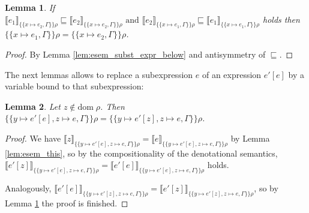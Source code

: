 \documentclass{jfp1}
\newtheorem{lemma}{Lemma}
\theoremstyle{nonumberbreak}
\newtheorem{proof}{Proof}
\newcommand{\dom}[1]{\text{dom}\;#1}
\newcommand{\dsem}[2]{\llbracket #1 \rrbracket_{#2}}
\newcommand{\esem}[1]{\{\!\!\!\{#1\}\!\!\!\}}
\begin{document}
\begin{lemma}
If
$\dsem{e_1}{\esem{x \mapsto e_2, \Gamma}\rho} \sqsubseteq \dsem{e_2}{\esem{x \mapsto e_2, \Gamma}\rho}
\text{ and }
\dsem{e_2}{\esem{x \mapsto e_1, \Gamma}\rho} \sqsubseteq \dsem{e_1}{\esem{x \mapsto e_1, \Gamma}\rho}
$
holds then $\esem{x \mapsto e_1, \Gamma}\rho = \esem{x \mapsto e_2, \Gamma}\rho$.
\label{lem:esem_subst_expr}
\end{lemma}

\begin{proof}
By Lemma \ref{lem:esem_subst_expr_below} and antisymmetry of $\sqsubseteq$.
\end{proof}

The next lemmas allows to replace a subexpression $e$ of an expression $e'[e]$ by a variable bound to that subexpression:

\begin{lemma}
Let $z \notin \dom \rho$. Then $\esem{y \mapsto e'[e], z \mapsto e, \Gamma}\rho = \esem{y \mapsto e'[z], z \mapsto e, \Gamma}\rho$.
\label{lem:exp_var_subst}
\label{lem:var_var_subst}
\end{lemma}

\begin{proof}
We have
$\dsem{z}{\esem{y \mapsto e'[e], z \mapsto e, \Gamma}\rho} = \dsem{e}{\esem{y \mapsto e'[e], z \mapsto e, \Gamma}\rho}$ by Lemma \ref{lem:esem_this}, so by the compositionality of the denotational semantics, $\dsem{e'[z]}{{\esem{y \mapsto e'[e], z \mapsto e, \Gamma}\rho}} = \dsem{e'[e]}{{\esem{y \mapsto e'[e], z \mapsto e, \Gamma}\rho}}$ holds.

Analogously, $\dsem{e'[e]}{{\esem{y \mapsto e'[z], z \mapsto e, \Gamma}\rho}} = \dsem{e'[z]}{{\esem{y \mapsto e'[z], z \mapsto e, \Gamma}\rho}}$, so by Lemma \ref{lem:esem_subst_expr} the proof is finished.
\end{proof}
\end{document}
